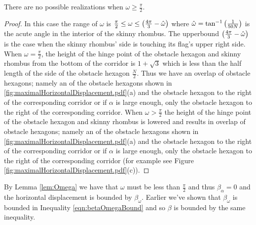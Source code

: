 \begin{lem}\label{lem:Omega}
There are no possible realizations when $\omega \geq \frac{\pi}{2}$.
\end{lem}
\begin{proof}
In this case the range of $\omega$ is $\frac{\pi}{2} \leq \omega \leq \left( \frac{4 \pi}{3} - \hat{\omega} \right)$ where $\hat{\omega} = \tan^{-1} \left( \frac{1}{50N} \right)$ is the acute angle in the interior of the skinny rhombus.  
The upperbound $\left( \frac{4 \pi}{3} - \hat{\omega} \right)$ is the case when the skinny rhombus' side is touching its flag's upper right side.  
When $\omega = \frac{\pi}{2}$, the height of the hinge point of the obstacle hexagon and skinny rhombus from the bottom of the corridor is $1 + \sqrt{3}$ which is less than the half length of the side of the obstacle hexagon $\frac{N}{2}$.  
Thus we have an overlap of obstacle hexagons; namely an of the obstacle hexagons shown in \ref{fig:maximalHorizontalDisplacement.pdf}(a) and the obstacle hexagon to the right of the corresponding corridor or if $\alpha$ is large enough, only the obstacle hexagon to the right of the corresponding corridor.
When $\omega > \frac{\pi}{2}$ the height of the hinge point of the obstacle hexagon and skinny rhombus is lowered and results in overlap of obstacle hexagons; namely an of the obstacle hexagons shown in \ref{fig:maximalHorizontalDisplacement.pdf}(a) and the obstacle hexagon to the right of the corresponding corridor or if $\alpha$ is large enough, only the obstacle hexagon to the right of the corresponding corridor (for example see Figure \ref{fig:maximalHorizontalDisplacement.pdf}(c)).
\end{proof}

By Lemma \ref{lem:Omega} we have that $\omega$ must be less than $\frac{\pi}{2}$ and thus $\beta_\alpha = 0$ and the horizontal displacement is bounded by $\beta_\omega$.    
Earlier we've shown that $\beta_\omega$ is bounded in Inequality \ref{eqn:betaOmegaBound} and so $\beta$ is bounded by the same inequality.



